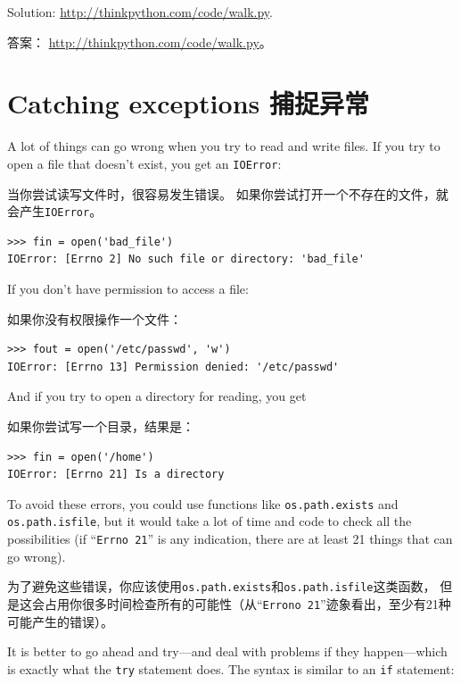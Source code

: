 \documentclass[10pt]{book}
\begin{document}
\begin{CJK}{UTF8}{gbsn}
\begin{exercise}
Solution: \url{http://thinkpython.com/code/walk.py}.

答案： \url{http://thinkpython.com/code/walk.py}。

\end{exercise}


\section{Catching exceptions 捕捉异常}
\label{catch}

A lot of things can go wrong when you try to read and write
files.  If you try to open a file that doesn't exist, you get an
{\tt IOError}:

当你尝试读写文件时，很容易发生错误。
如果你尝试打开一个不存在的文件，就会产生{\tt IOError}。

\begin{verbatim}
>>> fin = open('bad_file')
IOError: [Errno 2] No such file or directory: 'bad_file'
\end{verbatim}
%
If you don't have permission to access a file:

如果你没有权限操作一个文件：

\begin{verbatim}
>>> fout = open('/etc/passwd', 'w')
IOError: [Errno 13] Permission denied: '/etc/passwd'
\end{verbatim}
%
And if you try to open a directory for reading, you get

如果你尝试写一个目录，结果是：

\begin{verbatim}
>>> fin = open('/home')
IOError: [Errno 21] Is a directory
\end{verbatim}
%
To avoid these errors, you could use functions like {\tt os.path.exists}
and {\tt os.path.isfile}, but it would take a lot of time and code
to check all the possibilities (if ``{\tt Errno 21}'' is any
indication, there are at least 21 things that can go wrong).

为了避免这些错误，你应该使用{\tt os.path.exists}和{\tt os.path.isfile}这类函数，
但是这会占用你很多时间检查所有的可能性（从``{\tt Errono 21}''迹象看出，至少有21种可能产生的错误）。

It is better to go ahead and try---and deal with problems if they
happen---which is exactly what the {\tt try} statement does.  The
syntax is similar to an {\tt if} statement:


\end{CJK}
\end{document}
